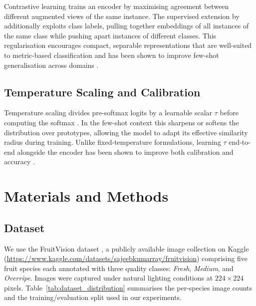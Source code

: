 \documentclass[preprint,12pt,authoryear]{elsarticle}
\begin{document}
Contrastive learning \citep{chen2020simple} trains an encoder by maximising
agreement between different augmented views of the same instance. The supervised
extension by \citet{khosla2020supervised} additionally exploits class labels,
pulling together embeddings of all instances of the same class while pushing apart
instances of different classes. This regularisation encourages compact, separable
representations that are well-suited to metric-based classification and has been
shown to improve few-shot generalisation across domains \citep{tian2020rethinking}.

\subsection{Temperature Scaling and Calibration}

Temperature scaling divides pre-softmax logits by a learnable scalar $\tau$
before computing the softmax \citep{guo2017calibration}. In the few-shot context
this sharpens or softens the distribution over prototypes, allowing the model to
adapt its effective similarity radius during training. Unlike fixed-temperature
formulations, learning $\tau$ end-to-end alongside the encoder has been shown to
improve both calibration and accuracy \citep{oreshkin2018tadam}.

\section{Materials and Methods}
\label{materials_methods}

\subsection{Dataset}

We use the FruitVision dataset \citep{fruitvision2023}, a publicly available
image collection on Kaggle (\url{https://www.kaggle.com/datasets/sajeebkumarray/fruitvision})
comprising five fruit species each annotated with three quality classes: \emph{Fresh},
\emph{Medium}, and \emph{Overripe}. Images were captured under natural lighting
conditions at $224 \times 224$ pixels. Table~\ref{tab:dataset_distribution} summarises
the per-species image counts and the training/evaluation split used in our experiments.
\end{document}
